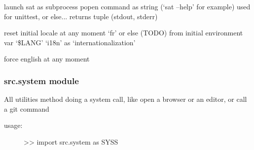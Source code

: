 \documentclass[a4paper,10pt,english]{sphinxmanual}
\begin{document}

\begin{fulllineitems}
\label{commands/apidoc/src:src.salomeTools.launchSat}
launch sat as subprocess popen
command as string (`sat --help' for example)
used for unittest, or else...
returns tuple (stdout, stderr)

\end{fulllineitems}


\begin{fulllineitems}
\label{commands/apidoc/src:src.salomeTools.setLocale}
reset initial locale at any moment 
`fr' or else (TODO) from initial environment var `\$LANG'
`i18n' as `internationalization'

\end{fulllineitems}


\begin{fulllineitems}
\label{commands/apidoc/src:src.salomeTools.setNotLocale}
force english at any moment

\end{fulllineitems}



\subsubsection{src.system module}
\label{commands/apidoc/src:src-system-module}\label{commands/apidoc/src:module-src.system}
All utilities method doing a system call, 
like open a browser or an editor, or call a git command
\begin{description}
\item[{usage:}] \leavevmode
\textgreater{}\textgreater{} import src.system as SYSS

\end{description}
\end{document}
